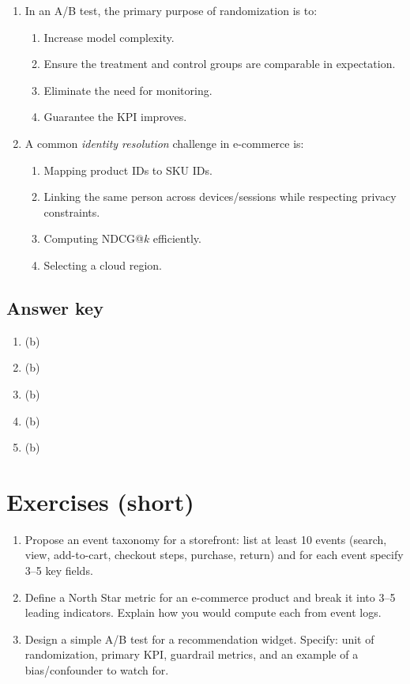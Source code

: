 \begin{enumerate}
  \item In an A/B test, the primary purpose of randomization is to:
  \begin{enumerate}
    \item Increase model complexity.
    \item Ensure the treatment and control groups are comparable in expectation.
    \item Eliminate the need for monitoring.
    \item Guarantee the KPI improves.
  \end{enumerate}

  \item A common \emph{identity resolution} challenge in e-commerce is:
  \begin{enumerate}
    \item Mapping product IDs to SKU IDs.
    \item Linking the same person across devices/sessions while respecting privacy constraints.
    \item Computing NDCG@$k$ efficiently.
    \item Selecting a cloud region.
  \end{enumerate}
\end{enumerate}

\subsection*{Answer key}
\begin{enumerate}
  \item (b)
  \item (b)
  \item (b)
  \item (b)
  \item (b)
\end{enumerate}

\section{Exercises (short)}
\begin{enumerate}
  \item Propose an event taxonomy for a storefront: list at least 10 events (search, view, add-to-cart, checkout steps, purchase, return) and for each event specify 3--5 key fields.
  \item Define a North Star metric for an e-commerce product and break it into 3--5 leading indicators. Explain how you would compute each from event logs.
  \item Design a simple A/B test for a recommendation widget. Specify: unit of randomization, primary KPI, guardrail metrics, and an example of a bias/confounder to watch for.
\end{enumerate}

